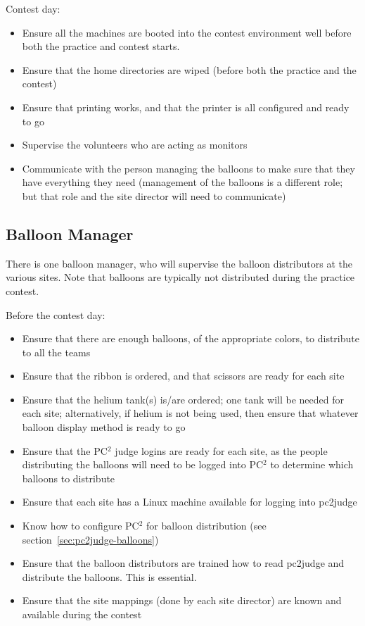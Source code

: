 \documentclass[11pt,twoside,letterpaper]{book}
\newenvironment{itemlist}{
\begin{itemize}
\setlength{\itemsep}{0pt}
\setlength{\parskip}{0pt}}
{\end{itemize}}
\begin{document}
\noindent Contest day:

\begin{itemlist}
\item Ensure all the machines are booted into the contest environment
  well before both the practice and contest starts.
\item Ensure that the home directories are wiped (before both the
  practice and the contest)
\item Ensure that printing works, and that the printer is all
  configured and ready to go
\item Supervise the volunteers who are acting as monitors
\item Communicate with the person managing the balloons to make sure
  that they have everything they need (management of the balloons is a
  different role; but that role and the site director will need to
  communicate)
\end{itemlist}


\subsection{Balloon Manager}

\noindent There is one balloon manager, who will supervise the balloon
distributors at the various sites.  Note that balloons are typically
not distributed during the practice contest.

\noindent Before the contest day:

\begin{itemlist}
\item Ensure that there are enough balloons, of the appropriate
  colors, to distribute to all the teams
\item Ensure that the ribbon is ordered, and that scissors are ready
  for each site
\item Ensure that the helium tank(s) is/are ordered; one tank will be
  needed for each site; alternatively, if helium is not being used,
  then ensure that whatever balloon display method is ready to go
\item Ensure that the PC$^2$ judge logins are ready for each site, as
  the people distributing the balloons will need to be logged into
  PC$^2$ to determine which balloons to distribute
\item Ensure that each site has a Linux machine available for logging
  into pc2judge
\item Know how to configure PC$^2$ for balloon distribution (see
  section~\ref{sec:pc2judge-balloons})
\item Ensure that the balloon distributors are trained how to read
  pc2judge and distribute the balloons.  This is essential.
\item Ensure that the site mappings (done by each site director) are
  known and available during the contest
\end{itemlist}
\end{document}
